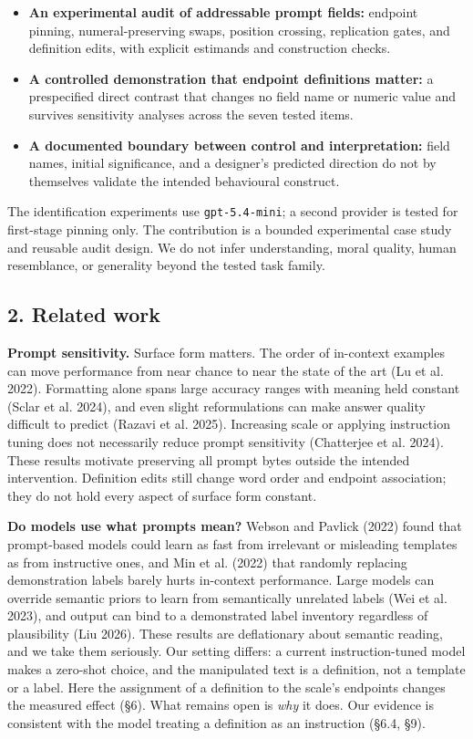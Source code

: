 \documentclass[
  11pt]{article}
\providecommand{\tightlist}{%
  \setlength{\itemsep}{0pt}\setlength{\parskip}{0pt}}
\begin{document}
\begin{itemize}
\tightlist
\item
  \textbf{An experimental audit of addressable prompt fields:} endpoint
  pinning, numeral-preserving swaps, position crossing, replication
  gates, and definition edits, with explicit estimands and construction
  checks.
\item
  \textbf{A controlled demonstration that endpoint definitions matter:}
  a prespecified direct contrast that changes no field name or numeric
  value and survives sensitivity analyses across the seven tested items.
\item
  \textbf{A documented boundary between control and interpretation:}
  field names, initial significance, and a designer's predicted
  direction do not by themselves validate the intended behavioural
  construct.
\end{itemize}

The identification experiments use \texttt{gpt-5.4-mini}; a second
provider is tested for first-stage pinning only. The contribution is a
bounded experimental case study and reusable audit design. We do not
infer understanding, moral quality, human resemblance, or generality
beyond the tested task family.

\subsection{2. Related work}\label{related-work}

\textbf{Prompt sensitivity.} Surface form matters. The order of
in-context examples can move performance from near chance to near the
state of the art (Lu et al. 2022). Formatting alone spans large accuracy
ranges with meaning held constant (Sclar et al. 2024), and even slight
reformulations can make answer quality difficult to predict (Razavi et
al. 2025). Increasing scale or applying instruction tuning does not
necessarily reduce prompt sensitivity (Chatterjee et al. 2024). These
results motivate preserving all prompt bytes outside the intended
intervention. Definition edits still change word order and endpoint
association; they do not hold every aspect of surface form constant.

\textbf{Do models use what prompts mean?} Webson and Pavlick (2022)
found that prompt-based models could learn as fast from irrelevant or
misleading templates as from instructive ones, and Min et al. (2022)
that randomly replacing demonstration labels barely hurts in-context
performance. Large models can override semantic priors to learn from
semantically unrelated labels (Wei et al. 2023), and output can bind to
a demonstrated label inventory regardless of plausibility (Liu 2026).
These results are deflationary about semantic reading, and we take them
seriously. Our setting differs: a current instruction-tuned model makes
a zero-shot choice, and the manipulated text is a definition, not a
template or a label. Here the assignment of a definition to the scale's
endpoints changes the measured effect (§6). What remains open is
\emph{why} it does. Our evidence is consistent with the model treating a
definition as an instruction (§6.4, §9).
\end{document}
